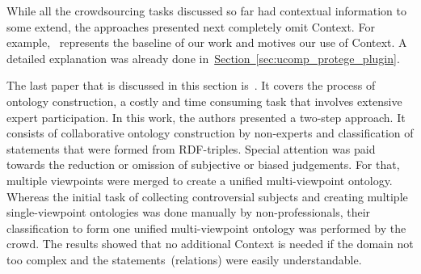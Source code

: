 While all the crowdsourcing tasks discussed so far had contextual information to some extend, the approaches presented next completely omit Context. 
For example,~\cite{wohlgenannt2016} represents the baseline of our work and motives our use of Context. A detailed explanation was already done in~\hyperref[sec:ucomp_protege_plugin]{Section~\ref*{sec:ucomp_protege_plugin}}.

The last paper that is discussed in this section is~\cite{zhitomirsky2017}. It covers the process of ontology construction, a costly and time consuming task that involves extensive expert participation. In this work, the authors presented a two-step approach. It consists of collaborative ontology construction by non-experts and classification of statements that were formed from RDF-triples. Special attention was paid towards the reduction or omission of subjective or biased judgements. For that, multiple viewpoints were merged to create a unified multi-viewpoint ontology.
Whereas the initial task of collecting controversial subjects and creating multiple single-viewpoint ontologies was done manually by non-professionals, their classification to form one unified multi-viewpoint ontology was performed by the crowd. 
The results showed that no additional Context is needed if the domain not too complex and the statements~(relations) were easily understandable.  


